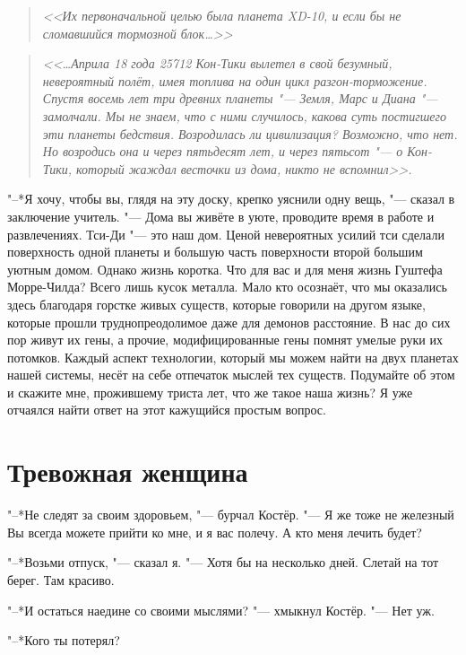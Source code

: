 \documentclass[a4paper,10pt,fleqn]{book}
\newcommand{\ldotst}{\so{...}\xspace}
\begin{document}
\begin{quote}\textit{
<<Их первоначальной целью была планета XD-10, и если бы не сломавшийся тормозной блок\ldots>>
}\end{quote}

\begin{quote}\textit{
<<\dots Априла 18 года 25712 Кон-Тики вылетел в свой безумный, невероятный полёт, имея топлива на один цикл разгон-торможение.
Спустя восемь лет три древних планеты "--- Земля, Марс и Диана "--- замолчали.
Мы не знаем, что с ними случилось, какова суть постигшего эти планеты бедствия.
Возродилась ли цивилизация?
Возможно, что нет.
Но возродись она и через пятьдесят лет, и через пятьсот "--- о Кон-Тики, который жаждал весточки из дома, никто не вспомнил>>.
}\end{quote}

"--*Я хочу, чтобы вы, глядя на эту доску, крепко уяснили одну вещь, "--- сказал в заключение учитель.
"--- Дома вы живёте в уюте, проводите время в работе и развлечениях.
Тси-Ди "--- это наш дом.
Ценой невероятных усилий тси сделали поверхность одной планеты и большую часть поверхности второй большим уютным домом.
Однако жизнь коротка.
Что для вас и для меня жизнь Гуштефа Морре-Чилда?
Всего лишь кусок металла.
Мало кто осознаёт, что мы оказались здесь благодаря горстке живых существ, которые говорили на другом языке, которые прошли труднопреодолимое даже для демонов расстояние.
В нас до сих пор живут их гены, а прочие, модифицированные гены помнят умелые руки их потомков.
Каждый аспект технологии, который мы можем найти на двух планетах нашей системы, несёт на себе отпечаток мыслей тех существ.
Подумайте об этом и скажите мне, прожившему триста лет, что же такое наша жизнь?
Я уже отчаялся найти ответ на этот кажущийся простым вопрос.

\section{Тревожная женщина}

"--*Не следят за своим здоровьем, "--- бурчал Костёр.
"--- Я же тоже не железный\ldotst
Вы всегда можете прийти ко мне, и я вас полечу.
А кто меня лечить будет?

"--*Возьми отпуск, "--- сказал я.
"--- Хотя бы на несколько дней.
Слетай на тот берег.
Там красиво.

"--*И остаться наедине со своими мыслями? "--- хмыкнул Костёр.
"--- Нет уж.

"--*Кого ты потерял?
\end{document}
